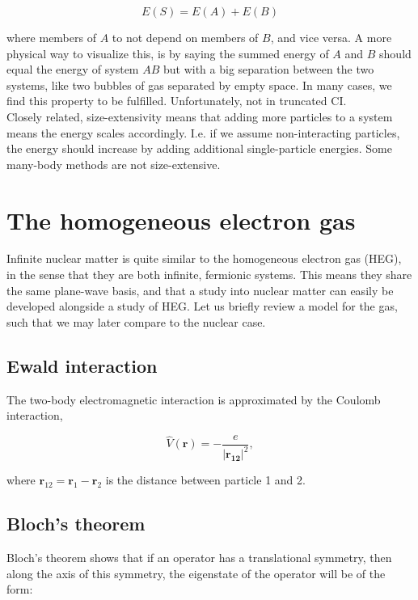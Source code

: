 \documentclass[10pt]{report}
\begin{document}
	\begin{equation}
		E(S) = E(A) + E(B)
	\end{equation}
	
	where members of $A$ to not depend on members of $B$, and vice versa. A more physical way to visualize this, is by saying the summed energy of $A$ and $B$ should equal the energy of system $AB$ but with a big separation between the two systems, like two bubbles of gas separated by empty space. In many cases, we find this property to be fulfilled. Unfortunately, not in truncated CI.\\
	
	Closely related, size-extensivity means that adding more particles to a system means the energy scales accordingly. I.e. if we assume non-interacting particles, the energy should increase by adding additional single-particle energies. Some many-body methods are not size-extensive.
	
	\section{The homogeneous electron gas}
	Infinite nuclear matter is quite similar to the homogeneous electron gas (HEG), in the sense that they are both infinite, fermionic systems. This means they share the same plane-wave basis, and that a study into nuclear matter can easily be developed alongside a study of HEG. Let us briefly review a model for the gas, such that we may later compare to the nuclear case.\\
	
	
	\subsection{Ewald interaction}
	The two-body electromagnetic interaction is approximated by the Coulomb interaction,
	
	\begin{equation}
		\hat{V}(\bm{r}) = -\frac{e}{|\bm{r_{12}}|^2},
	\end{equation}
	
	where $\bm{r}_{12} = \bm{r}_1 - \bm{r}_2$ is the distance between particle 1 and 2.
	
	\subsection{Bloch's theorem}
	Bloch's theorem shows that if an operator has a translational symmetry, then along the axis of this symmetry, the eigenstate of the operator will be of the form:
	
\end{document}
